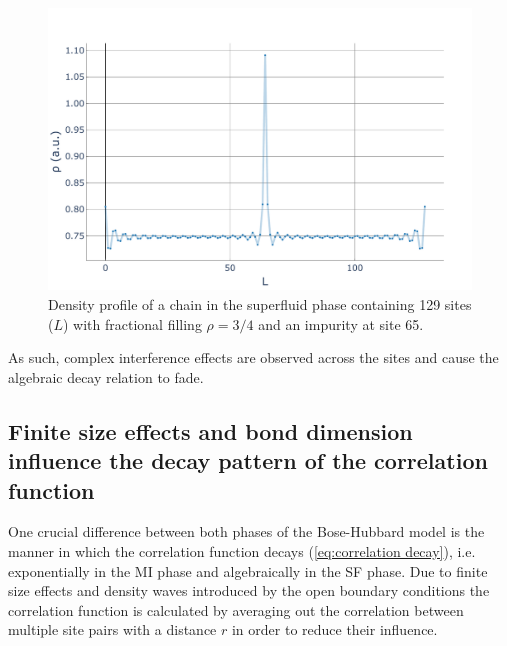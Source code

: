 \documentclass[twoside,twocolumn,9pt]{article}
\begin{document}
\begin{center}
  \begin{figure}
      \includegraphics[width=\linewidth]{../code/figures/Density-profiles-fractional-impurity.pdf}
      \caption{Density profile of a chain in the superfluid phase containing 129 sites ($L$) with fractional filling $\rho=3/4$ and an impurity at site 65.}
      \label{fig:waves-impurity}
  \end{figure}
\end{center}
As such, complex interference effects are observed across the sites and cause the algebraic decay relation to fade. 

\subsection{Finite size effects and bond dimension influence the decay pattern of the correlation function}
One crucial difference between both phases of the Bose-Hubbard model is the manner in which the correlation function decays (\cref{eq:correlation decay}), i.e. exponentially in the MI phase and algebraically in the SF phase. Due to finite size effects and density waves introduced by the open boundary conditions the correlation function is calculated by averaging out the correlation between multiple site pairs with a distance $r$ in order to reduce their influence. 
\end{document}
